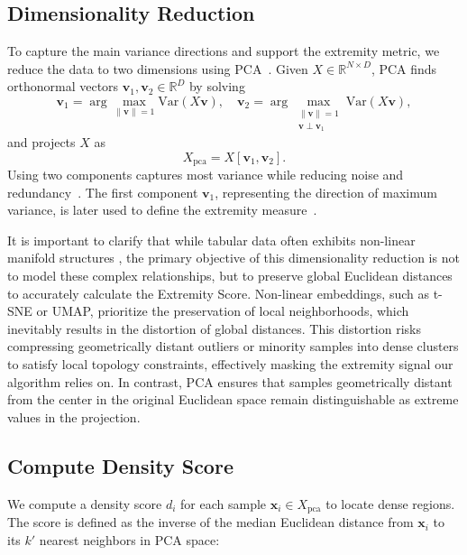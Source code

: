 \documentclass[preprint,12pt]{elsarticle}
\begin{document}
\subsection{Dimensionality Reduction} \label{subsec:dimen_reduc}

To capture the main variance directions and support the extremity metric, we reduce the data to two dimensions using PCA~\cite{jolliffe2011principal}. Given $X \in \mathbb{R}^{N\times D}$, PCA finds orthonormal vectors $\mathbf{v}_1,\mathbf{v}_2 \in \mathbb{R}^D$ by solving
\begin{equation}
\mathbf{v}_1 = \arg\max_{\|\mathbf{v}\|=1}\mathrm{Var}(X\mathbf{v}), 
\quad
\mathbf{v}_2 = \arg\max_{\substack{\|\mathbf{v}\|=1\\ \mathbf{v}\perp\mathbf{v}_1}}\mathrm{Var}(X\mathbf{v}),
\end{equation}
and projects $X$ as
\begin{equation}
X_{\text{pca}} = X[\mathbf{v}_1,\mathbf{v}_2].
\end{equation}
Using two components captures most variance while reducing noise and redundancy~\cite{salem2019data}. The first component $\mathbf{v}_1$, representing the direction of maximum variance, is later used to define the extremity measure~\cite{lakhina2004diagnosing}.

It is important to clarify that while tabular data often exhibits non-linear manifold structures \cite{li2025kernel}, the primary objective of this dimensionality reduction is not to model these complex relationships, but to preserve global Euclidean distances to accurately calculate the Extremity Score. Non-linear embeddings, such as t-SNE or UMAP, prioritize the preservation of local neighborhoods, which inevitably results in the distortion of global distances. This distortion risks compressing geometrically distant outliers or minority samples into dense clusters to satisfy local topology constraints, effectively masking the extremity signal our algorithm relies on. In contrast, PCA ensures that samples geometrically distant from the center in the original Euclidean space remain distinguishable as extreme values in the projection.


\subsection{Compute Density Score} \label{subsec:density_score_calc}  

We compute a density score $d_i$ for each sample $\mathbf{x}_i \in X_{\text{pca}}$ to locate dense regions. The score is defined as the inverse of the median Euclidean distance from $\mathbf{x}_i$ to its $k'$ nearest neighbors in PCA space:
\end{document}
